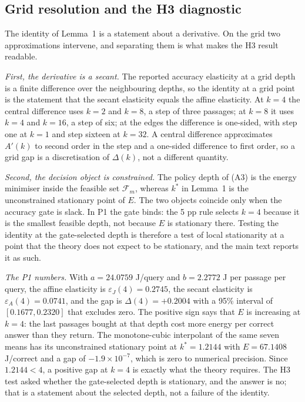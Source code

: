 \subsection{Grid resolution and the H3 diagnostic}\label{app:grid}

The identity of Lemma~1 is a statement about a derivative. On the grid two
approximations intervene, and separating them is what makes the H3 result
readable.

\emph{First, the derivative is a secant.} The reported accuracy elasticity at a
grid depth is a finite difference over the neighbouring depths, so the identity
at a grid point is the statement that the secant elasticity equals the affine
elasticity. At $k=4$ the central difference uses $k=2$ and $k=8$, a step of three
passages; at $k=8$ it uses $k=4$ and $k=16$, a step of six; at the edges the
difference is one-sided, with step one at $k=1$ and step sixteen at $k=32$. A
central difference approximates $A'(k)$ to second order in the step and a
one-sided difference to first order, so a grid gap is a discretisation of
$\Delta(k)$, not a different quantity.

\emph{Second, the decision object is constrained.} The policy depth of (A3) is the
energy minimiser inside the feasible set $\mathcal{F}_{m}$, whereas $k^{*}$ in
Lemma~1 is the unconstrained stationary point of $E$. The two objects coincide
only when the accuracy gate is slack. In P1 the gate binds: the 5 pp rule selects
$k=4$ because it is the smallest feasible depth, not because $E$ is stationary
there. Testing the identity at the gate-selected depth is therefore a test of
local stationarity at a point that the theory does not expect to be stationary,
and the main text reports it as such.

\emph{The P1 numbers.} With $a=24.0759$ J/query and
$b=2.2772$ J per passage per query, the affine elasticity is
$\varepsilon_{J}(4)=0.2745$, the secant elasticity is
$\varepsilon_{A}(4)=0.0741$, and the gap is $\Delta(4)=+0.2004$ with a 95\%
interval of $[0.1677,0.2320]$ that excludes zero. The positive sign says that
$E$ is increasing at $k=4$: the last passages bought at that depth cost more
energy per correct answer than they return. The monotone-cubic interpolant of the
same seven means has its unconstrained stationary point at $k^{*}=1.2144$ with
$E=67.1408$ J/correct and a gap of $-1.9\times10^{-7}$, which is zero to numerical
precision. Since $1.2144<4$, a positive gap at $k=4$ is exactly what the theory
requires. The H3 test asked whether the gate-selected depth is stationary, and
the answer is no; that is a statement about the selected depth, not a failure of
the identity.

